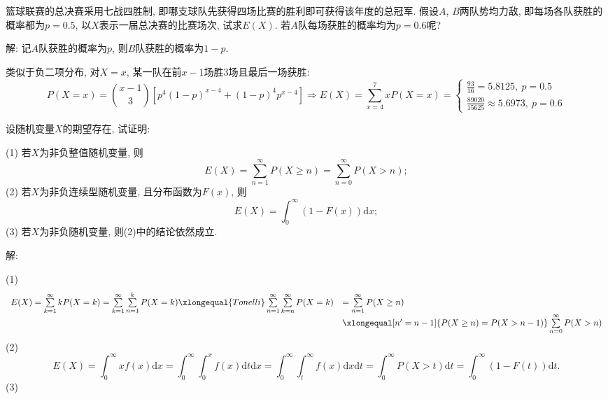 \documentclass[standard]{ExBook}
\renewenvironment{shaded}{%
  \def\FrameCommand{\fboxsep=\FrameSep \colorbox{shadecolor}}%
  \MakeFramed{\advance\hsize-\width \FrameRestore}%
}{%
  \endMakeFramed
}
\begin{document}
\begin{qitems}
    \begin{bbox}
    \begin{shaded}
        \qitem 
篮球联赛的总决赛采用七战四胜制, 即哪支球队先获得四场比赛的胜利即可获得该年度的总冠军. 假设$A$, $B$两队势均力敌, 即每场各队获胜的概率都为$p = 0.5$, 以$X$表示一届总决赛的比赛场次, 试求$E(X)$. 若$A$队每场获胜的概率均为$p = 0.6$呢?
    \end{shaded}
    \end{bbox}

\vspace{\dimexpr2.5cm-5em\relax}

解: 记$A$队获胜的概率为$p$, 则$B$队获胜的概率为$1-p$.

类似于负二项分布, 对$X=x$, 某一队在前$x-1$场胜3场且最后一场获胜:
$$
    P(X=x)=\binom{x-1}{3}\left[p^{4}(1-p)^{x-4}+(1-p)^{4}p^{x-4}\right]
    \Longrightarrow
    E(X)=
    \sum\limits_{x=4}^{7}xP(X=x)
    =
    \left\{
\begin{array}{l}
    \frac{93}{16}=5.8125,\ p=0.5\\
    \frac{89020}{15625}\approx5.6973,\ p=0.6
\end{array}
    \right.
$$

\vspace{2.5cm-5em}

    \begin{bbox}
    \begin{shaded}
        \qitem
设随机变量$X$的期望存在, 试证明:

(1) 若$X$为非负整值随机变量, 则
$$E(X)=\sum\limits_{n=1}^{\infty}P(X\geq n)=\sum\limits_{n=0}^{\infty}P(X>n);$$
(2) 若$ X $为非负连续型随机变量, 且分布函数为$F(x)$, 则
$$E(X)=\int_{0}^{\infty}(1-F(x))\mathrm{d}x;$$
(3) 若$ X $为非负随机变量, 则(2)中的结论依然成立.
    \end{shaded}
    \end{bbox}

\vspace{\dimexpr2.5cm-5em\relax}

解: 

(1)
$$
\begin{array}{ll}
    E(X)=\sum\limits_{k=1}^{\infty}k P(X=k)=\sum\limits_{k=1}^{\infty}\sum\limits_{n=1}^{k}P(X=k)\xlongequal{Tonelli}\sum\limits_{n=1}^{\infty}\sum\limits_{k=n}^{\infty}P(X=k) & =\sum\limits_{n=1}^{\infty}P(X\geq n)\\
     & \xlongequal[n'=n-1]{P(X\geq n)=P(X>n-1)}\sum\limits_{n=0}^{\infty}P(X>n)
\end{array}
$$
(2)
$$E(X)=\displaystyle\int_{0}^{\infty}xf(x)\mathrm{d}x=\int_{0}^{\infty}\int_{0}^{x}f(x)\mathrm{d}t\mathrm{d}x=\int_{0}^{\infty}\int_{t}^{\infty}f(x)\mathrm{d}x\mathrm{d}t=\int_{0}^{\infty}P(X>t)\mathrm{d}t=\int_{0}^{\infty}(1-F(t))\mathrm{d}t.$$
(3)


\end{qitems}
\end{document}
